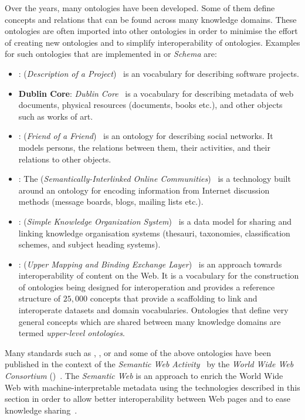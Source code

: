 Over the years, many ontologies have been developed. Some of them define concepts and relations that can be found across many knowledge domains. These ontologies are often imported into other ontologies in order to minimise the effort of creating new ontologies and to simplify interoperability of ontologies. Examples for such ontologies that are implemented in  or \emph{ Schema} are:
\begin{itemize}
  \item \textbf{}:  (\emph{Description of a Project})~\cite{DOAP} is an vocabulary for describing software projects.
  \item \textbf{Dublin Core}: \emph{Dublin Core}~\cite{DublinCoreWeb,rfc5013} is a vocabulary for describing metadata of web documents, physical resources (documents, books etc.), and other objects such as works of art.
  \item \textbf{}:  (\emph{Friend of a Friend})~\cite{FOAFWeb,FOAF} is an ontology for describing social networks. It models persons, the relations between them, their activities, and their relations to other objects.
  \item \textbf{}: The  (\emph{Semantically-Interlinked Online Communities})~\cite{SIOC} is a technology built around an ontology for encoding information from Internet discussion methods (message boards, blogs, mailing lists etc.).
  \item \textbf{}:  (\emph{Simple Knowledge Organization System})~\cite{SKOSWeb,SKOS} is a data model for sharing and linking knowledge organisation systems (thesauri, taxonomies, classification schemes, and subject heading systems).
  \item \textbf{}:  (\emph{Upper Mapping and Binding Exchange Layer})~\cite{UMBEL} is an approach towards interoperability of content on the Web. It is a vocabulary for the construction of ontologies being designed for interoperation and provides a reference structure of $25,000$ concepts that provide a scaffolding to link and interoperate datasets and domain vocabularies. Ontologies that define very general concepts which are shared between many knowledge domains are termed \emph{upper-level ontologies}.~\cite{upper_ontology}
\end{itemize}

Many standards such as , , or  and some of the above ontologies have been published in the context of the \emph{ Semantic Web Activity}~\cite{w3c_semantic_web} by the \emph{World Wide Web Consortium} ()~\cite{W3C}. The \emph{Semantic Web} is an approach to enrich the World Wide Web with machine-interpretable metadata using the technologies described in this section in order to allow better interoperability between Web pages and to ease knowledge sharing~\cite{semantic_web}.

